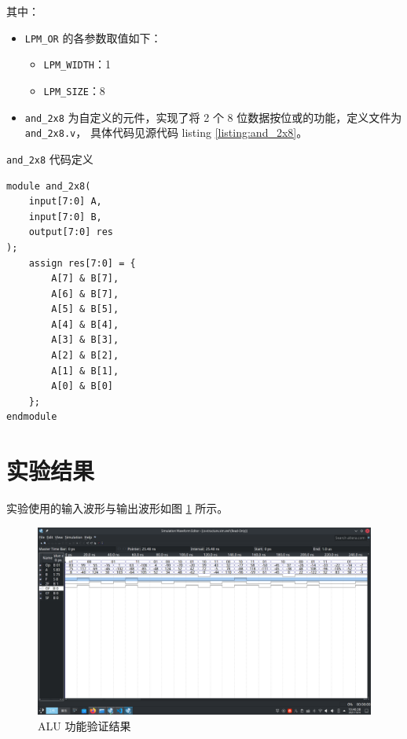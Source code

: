 其中：
\begin{itemize}
    \item \verb|LPM_OR| 的各参数取值如下：
    \begin{itemize}
        \item \verb|LPM_WIDTH|：1
        \item \verb|LPM_SIZE|：8
    \end{itemize}
    \item \verb|and_2x8| 为自定义的元件，实现了将 2 个 8 位数据按位或的功能，定义文件为\verb|and_2x8.v|，
    具体代码见源代码 listing \ref{listing:and_2x8}。
\end{itemize}

\begin{listing}[h]
    \caption{\texttt{and\_2x8} 代码定义}
    \label{listing:and_2x8}
    \begin{verbatim}
module and_2x8(
    input[7:0] A,
    input[7:0] B,
    output[7:0] res
);
    assign res[7:0] = {
        A[7] & B[7],
        A[6] & B[7],
        A[5] & B[5],
        A[4] & B[4],
        A[3] & B[3],
        A[2] & B[2],
        A[1] & B[1],
        A[0] & B[0]
    };
endmodule
    \end{verbatim}
\end{listing}

\section{实验结果}

实验使用的输入波形与输出波形如图 \ref{figure:2-result} 所示。

\begin{figure}
    \centering
    \caption{ALU 功能验证结果}
    \label{figure:2-result}
    \includegraphics[scale=0.2]{pics/2-result.png}
\end{figure}

